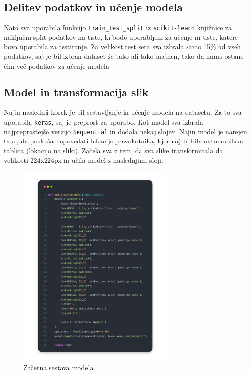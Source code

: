 \documentclass[a4paper,12pt]{article}
\begin{document}
\pagebreak

\subsection*{Delitev podatkov in učenje modela}
Nato sva uporabila funkcijo \texttt{train\_test\_split} iz \texttt{scikit-learn} knjižnice za naključni split podatkov na tiste, ki bodo uporabljeni za učenje in tiste, katere bova uporabila za testiranje. Za velikost test seta sva izbrala samo 15\% od vseh podatkov, saj je bil izbran dataset že tako ali tako majhen, tako da nama ostane čim več podatkov za učenje modela.

\subsection*{Model in transformacija slik}
Najin naslednji korak je bil sestavljanje in učenje modela na datasetu. Za to sva uporabila \texttt{keras}, saj je preprost za uporabo. Kot model sva izbrala najpreprostejšo verzijo \texttt{Sequential} in dodala nekaj slojev. Najin model je narejen tako, da poskuša napovedati lokacije pravokotnika, kjer naj bi bila avtomobilska tablica (lokacijo na sliki). Začela sva z tem, da sva slike transformirala do velikosti 224x224px in učila model z naslednjimi sloji.

\begin{figure}[H]
    \centering
    \includegraphics[width=0.7\textwidth]{img/build_custom_model1.png}
    \caption{Začetna sestava modela}
\end{figure}
\end{document}
